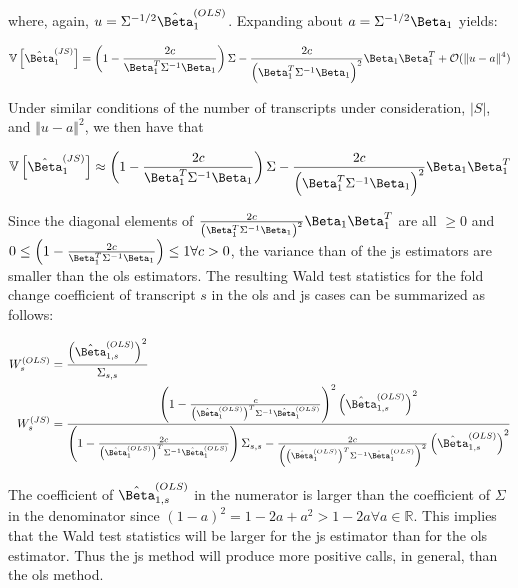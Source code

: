 where, again, $u = \Sigma^{-1/2} \hat{\Beta}_1^{(OLS)}$.
Expanding about $a = \Sigma^{-1/2} \Beta_1$ yields:

\begin{equation*}
  \mathbb{V} \left [ \hat{\Beta}_1^{(JS)} \right]
  = \left(1 - \frac{2c}{\Beta_1^T \Sigma^{-1} \Beta_1} \right) \Sigma
    - \frac{2c}{\left( \Beta_1^T \Sigma^{-1} \Beta_1 \right)^2} \Beta_1 \Beta_1^T
    + \mathcal{O}(\Vert u - a \Vert ^4)
\end{equation*}

Under similar conditions of the number of transcripts under consideration, $|S|$, and $\Vert u - a \Vert ^2$, we then have that

\begin{equation}
  \mathbb{V} \left [ \hat{\Beta}_1^{(JS)} \right]
  \approx \left(1 - \frac{2c}{\Beta_1^T \Sigma^{-1} \Beta_1} \right) \Sigma
  - \frac{2c}{\left( \Beta_1^T \Sigma^{-1} \Beta_1 \right)^2} \Beta_1 \Beta_1^T
\end{equation}

Since the diagonal elements of $\frac{2c}{\left( \Beta_1^T \Sigma^{-1} \Beta_1 \right)^2} \Beta_1 \Beta_1^T$ are all $\ge 0$ and $0 \le \left(1 - \frac{2c}{\Beta_1^T \Sigma^{-1} \Beta_1} \right) \le 1 \forall c > 0$, the variance than of the \gls{js} estimators are smaller than the \gls{ols} estimators.
The resulting Wald test statistics for the fold change coefficient of transcript $s$ in the \gls{ols} and \gls{js} cases can be summarized as follows:

\begin{align}
  W_s^{(OLS)} &= \frac{ \left( \hat{\Beta}_{1, s}^{(OLS)} \right)^2 }{ \Sigma_{s,s} } \\
  W_s^{(JS)} &= \frac{
    \left( 1 - \frac{ c }{ \left( \hat{\Beta}_1^{(OLS)} \right)^T \Sigma^{-1} \hat{\Beta}_1^{(OLS)} } \right)^2 \left( \hat{\Beta}_{1, s}^{(OLS)} \right)^2
  }{
    \left(1 - \frac{2c}{ \left( \hat{\Beta}_1^{(OLS)} \right)^T \Sigma^{-1} \hat{\Beta}_1^{(OLS)}} \right) \Sigma_{s,s}
    - \frac{2c}{\left( \left( \hat{\Beta}_1^{(OLS)} \right)^T \Sigma^{-1} \hat{\Beta}_1^{(OLS)} \right)^2} \left( \hat{\Beta}_{1, s}^{(OLS)} \right)^2
  }
\end{align}

The coefficient of $\hat{\Beta}_{1,s}^{(OLS)}$ in the numerator is larger than the coefficient of $\Sigma$ in the denominator since $(1 - a)^2 = 1 - 2a + a^2 > 1 - 2a \forall a \in \mathbb{R}$.
This implies that the Wald test statistics will be larger for the \gls{js} estimator than for the \gls{ols} estimator.
Thus the \gls{js} method will produce more positive calls, in general, than the \gls{ols} method.

